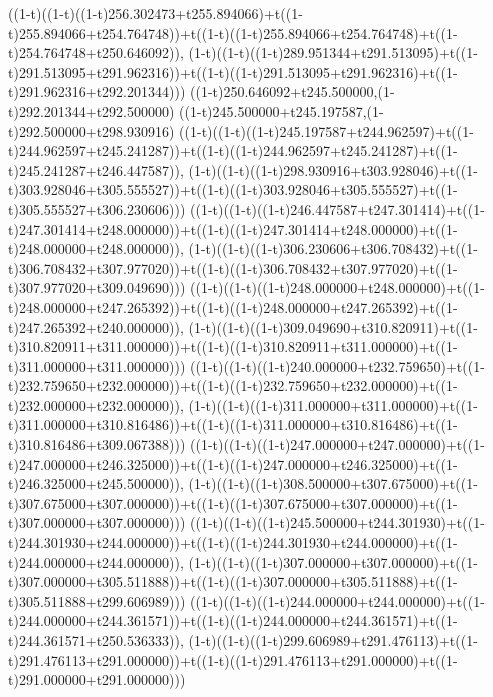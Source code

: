 ((1-t)((1-t)((1-t)256.302473+t255.894066)+t((1-t)255.894066+t254.764748))+t((1-t)((1-t)255.894066+t254.764748)+t((1-t)254.764748+t250.646092)),                                     (1-t)((1-t)((1-t)289.951344+t291.513095)+t((1-t)291.513095+t291.962316))+t((1-t)((1-t)291.513095+t291.962316)+t((1-t)291.962316+t292.201344)))
((1-t)250.646092+t245.500000,(1-t)292.201344+t292.500000)
((1-t)245.500000+t245.197587,(1-t)292.500000+t298.930916)
((1-t)((1-t)((1-t)245.197587+t244.962597)+t((1-t)244.962597+t245.241287))+t((1-t)((1-t)244.962597+t245.241287)+t((1-t)245.241287+t246.447587)),                                     (1-t)((1-t)((1-t)298.930916+t303.928046)+t((1-t)303.928046+t305.555527))+t((1-t)((1-t)303.928046+t305.555527)+t((1-t)305.555527+t306.230606)))
((1-t)((1-t)((1-t)246.447587+t247.301414)+t((1-t)247.301414+t248.000000))+t((1-t)((1-t)247.301414+t248.000000)+t((1-t)248.000000+t248.000000)),                                     (1-t)((1-t)((1-t)306.230606+t306.708432)+t((1-t)306.708432+t307.977020))+t((1-t)((1-t)306.708432+t307.977020)+t((1-t)307.977020+t309.049690)))
((1-t)((1-t)((1-t)248.000000+t248.000000)+t((1-t)248.000000+t247.265392))+t((1-t)((1-t)248.000000+t247.265392)+t((1-t)247.265392+t240.000000)),                                     (1-t)((1-t)((1-t)309.049690+t310.820911)+t((1-t)310.820911+t311.000000))+t((1-t)((1-t)310.820911+t311.000000)+t((1-t)311.000000+t311.000000)))
((1-t)((1-t)((1-t)240.000000+t232.759650)+t((1-t)232.759650+t232.000000))+t((1-t)((1-t)232.759650+t232.000000)+t((1-t)232.000000+t232.000000)),                                     (1-t)((1-t)((1-t)311.000000+t311.000000)+t((1-t)311.000000+t310.816486))+t((1-t)((1-t)311.000000+t310.816486)+t((1-t)310.816486+t309.067388)))
((1-t)((1-t)((1-t)247.000000+t247.000000)+t((1-t)247.000000+t246.325000))+t((1-t)((1-t)247.000000+t246.325000)+t((1-t)246.325000+t245.500000)),                                     (1-t)((1-t)((1-t)308.500000+t307.675000)+t((1-t)307.675000+t307.000000))+t((1-t)((1-t)307.675000+t307.000000)+t((1-t)307.000000+t307.000000)))
((1-t)((1-t)((1-t)245.500000+t244.301930)+t((1-t)244.301930+t244.000000))+t((1-t)((1-t)244.301930+t244.000000)+t((1-t)244.000000+t244.000000)),                                     (1-t)((1-t)((1-t)307.000000+t307.000000)+t((1-t)307.000000+t305.511888))+t((1-t)((1-t)307.000000+t305.511888)+t((1-t)305.511888+t299.606989)))
((1-t)((1-t)((1-t)244.000000+t244.000000)+t((1-t)244.000000+t244.361571))+t((1-t)((1-t)244.000000+t244.361571)+t((1-t)244.361571+t250.536333)),                                     (1-t)((1-t)((1-t)299.606989+t291.476113)+t((1-t)291.476113+t291.000000))+t((1-t)((1-t)291.476113+t291.000000)+t((1-t)291.000000+t291.000000)))

